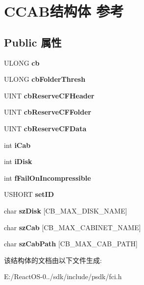 \hypertarget{struct_c_c_a_b}{}\section{C\+C\+A\+B结构体 参考}
\label{struct_c_c_a_b}
\subsection*{Public 属性}
\begin{DoxyCompactItemize}
\item 
\mbox{\label{struct_c_c_a_b_ae6b76ca9bc8b18ba8f4f745c3c27e623}} 
U\+L\+O\+NG {\bfseries cb}
\item 
\mbox{\label{struct_c_c_a_b_a2c971a919549fc37a86eea69602e42f0}} 
U\+L\+O\+NG {\bfseries cb\+Folder\+Thresh}
\item 
\mbox{\label{struct_c_c_a_b_aa4cf6c624fc82694ca241a5f983b5af5}} 
U\+I\+NT {\bfseries cb\+Reserve\+C\+F\+Header}
\item 
\mbox{\label{struct_c_c_a_b_a00f7f690aa7aad5252cde22e996c36f5}} 
U\+I\+NT {\bfseries cb\+Reserve\+C\+F\+Folder}
\item 
\mbox{\label{struct_c_c_a_b_a52b0292e7871f7d1686e524935e0519f}} 
U\+I\+NT {\bfseries cb\+Reserve\+C\+F\+Data}
\item 
\mbox{\label{struct_c_c_a_b_a5c91be8767c3438f4943ec38c6783b46}} 
int {\bfseries i\+Cab}
\item 
\mbox{\label{struct_c_c_a_b_aac2b5f05163322991b3872ba919d8648}} 
int {\bfseries i\+Disk}
\item 
\mbox{\label{struct_c_c_a_b_a2ecfcd05c339212958e3f0423bc12172}} 
int {\bfseries f\+Fail\+On\+Incompressible}
\item 
\mbox{\label{struct_c_c_a_b_ad64caf6987591ba2a634639e2580937f}} 
U\+S\+H\+O\+RT {\bfseries set\+ID}
\item 
\mbox{\label{struct_c_c_a_b_ac18b6b983bdf2e5a4637045b6b88ea64}} 
char {\bfseries sz\+Disk} \mbox{[}C\+B\+\_\+\+M\+A\+X\+\_\+\+D\+I\+S\+K\+\_\+\+N\+A\+ME\mbox{]}
\item 
\mbox{\label{struct_c_c_a_b_af677508025912ee09ae2ddd0d68092bd}} 
char {\bfseries sz\+Cab} \mbox{[}C\+B\+\_\+\+M\+A\+X\+\_\+\+C\+A\+B\+I\+N\+E\+T\+\_\+\+N\+A\+ME\mbox{]}
\item 
\mbox{\label{struct_c_c_a_b_ad7c12b657f2fc98430cd5df7f1465bf7}} 
char {\bfseries sz\+Cab\+Path} \mbox{[}C\+B\+\_\+\+M\+A\+X\+\_\+\+C\+A\+B\+\_\+\+P\+A\+TH\mbox{]}
\end{DoxyCompactItemize}


该结构体的文档由以下文件生成\+:\begin{DoxyCompactItemize}
\item 
E\+:/\+React\+O\+S-\/0../sdk/include/psdk/fci.\+h\end{DoxyCompactItemize}
